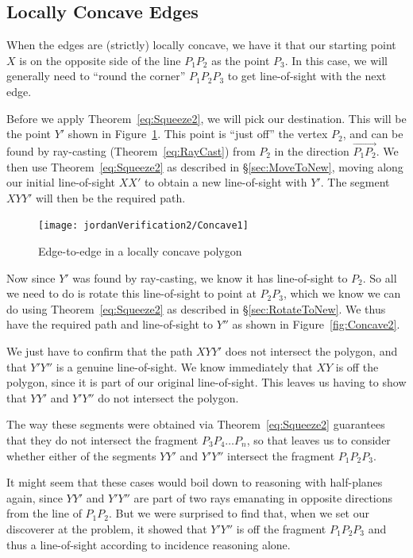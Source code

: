 \subsection{Locally Concave Edges}
When the edges are (strictly) locally concave, we have it that our starting point $X$ is on the opposite side of the line $P_1P_2$ as the point $P_3$. In this case, we will generally need to ``round the corner'' $P_1P_2P_3$ to get line-of-sight with the next edge. 

Before we apply Theorem~\ref{eq:Squeeze2}, we will pick our destination. This will be the point $Y'$ shown in Figure~\ref{fig:Concave1}. This point is ``just off'' the vertex $P_2$, and can be found by ray-casting (Theorem~\ref{eq:RayCast}) from $P_2$ in the direction $\overrightarrow{P_1P_2}$. We then use Theorem~\ref{eq:Squeeze2} as described in \S\ref{sec:MoveToNew}, moving along our initial line-of-sight $XX'$ to obtain a new line-of-sight with $Y'$. The segment $XYY'$ will then be the required path.

\begin{figure}
\centering\texttt{[image: jordanVerification2/Concave1]}
\caption{Edge-to-edge in a locally concave polygon}
\label{fig:Concave1}
\end{figure}

Now since $Y'$ was found by ray-casting, we know it has line-of-sight to $P_2$. So all we need to do is rotate this line-of-sight to point at $P_2P_3$, which we know we can do using Theorem~\ref{eq:Squeeze2} as described in \S\ref{sec:RotateToNew}. We thus have the required path and line-of-sight to $Y''$ as shown in Figure~\ref{fig:Concave2}.

We just have to confirm that the path $XYY'$ does not intersect the polygon, and that $Y'Y''$ is a genuine line-of-sight. We know immediately that $XY$ is off the polygon, since it is part of our original line-of-sight. This leaves us having to show that $YY'$ and $Y'Y''$ do not intersect the polygon. 

The way these segments were obtained via Theorem~\ref{eq:Squeeze2} guarantees that they do not intersect the fragment $P_3P_4\ldots P_n$, so that leaves us to consider whether either of the segments $YY'$ and $Y'Y''$ intersect the fragment $P_1P_2P_3$. 

It might seem that these cases would boil down to reasoning with half-planes again, since $YY'$ and $Y'Y''$ are part of two rays emanating in opposite directions from the line of $P_1P_2$. But we were surprised to find that, when we set our discoverer at the problem, it showed that $Y'Y''$ is off the fragment $P_1P_2P_3$ and thus a line-of-sight according to incidence reasoning alone.

